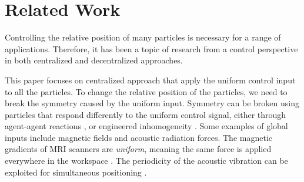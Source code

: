 
\section{Related Work}\label{sec:RelatedWork}

Controlling the relative position of many particles is necessary for a range of applications. Therefore, it has been a topic of research from a control perspective in both centralized and decentralized approaches. 

 This paper focuses on centralized approach that apply the uniform control input to all the particles. To change the relative position of the particles, we need to break the symmetry caused by the uniform input.
Symmetry can be broken using particles that respond differently to the uniform control signal, either through agent-agent reactions \cite{bertozzi2015ring}, or engineered inhomogeneity  \cite{Donald2013,bretl2007,beckerIJRR2014}. 
Some examples of global inputs include magnetic fields and acoustic radiation forces. The magnetic gradients of MRI scanners are \emph{uniform}, meaning the same force is applied everywhere in the workspace \cite{nosrati2018development}. The periodicity of the acoustic vibration can be exploited for simultaneous positioning \cite{oberti2007manipulation,zhou2016controlling,lipkens2017acoustic}. 

 

